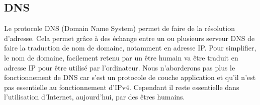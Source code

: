 \subsection{DNS}
Le protocole DNS (Domain Name System) permet de faire de la résolution d'adresse.
Cela permet grâce à des échange entre un ou plusieurs serveur DNS de faire la traduction
de nom de domaine, notamment en adresse IP. Pour simplifier, le nom de domaine, facilement
retenu par un être humain va être traduit en adresse IP pour être utilisé par l'ordinateur.
Nous n'aborderons pas plus le fonctionnement de DNS car s'est un protocole de couche application
et qu'il n'est pas essentielle au fonctionnement d'IPv4. Cependant il reste essentielle dans
l'utilisation d'Internet, aujourd'hui, par des êtres humains.
